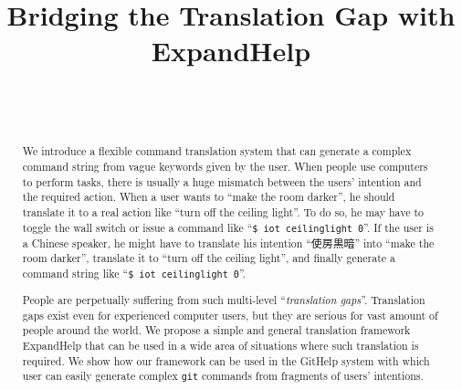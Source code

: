\documentclass{sigchi}
\def\plaintitle{Bridging the Translation Gap with ExpandHelp}
\begin{document}
\title{\plaintitle}

\author{%
  \\
  \\
}

\maketitle

\begin{abstract}
  We introduce a flexible command translation system that can generate
  a complex command string from vague keywords
  given by the user.
  When people use computers to perform tasks,
  there is usually a huge mismatch between the users' intention
  and the required action.
  When a user wants to ``make the room darker'',
  he should translate it to a real action like ``turn off the ceiling light''.
  To do so,
  he may have to toggle the wall switch
  or issue a command like ``\texttt{\$ iot ceilinglight 0}''.
  If the user is a Chinese speaker, he might have to translate his intention
  ``使房黒暗'' into ``make the room darker'',
  translate it to ``turn off the ceiling light'', 
  and finally generate a command string like ``\texttt{\$ iot ceilinglight 0}''.

  People are perpetually suffering from such multi-level ``\textit{translation gaps}''.
  Translation gaps exist even for experienced computer users, but
  they are serious for vast amount of people around the world.
  We propose a simple and general translation framework
  \textsf{ExpandHelp} that can be used in a wide area of situations
  where such translation is required.
  We show how our framework can be used
  in the \textsf{GitHelp} system
  with which user can easily generate complex \texttt{git} commands
  from fragments of users' intentions.

\end{abstract}
\end{document}

